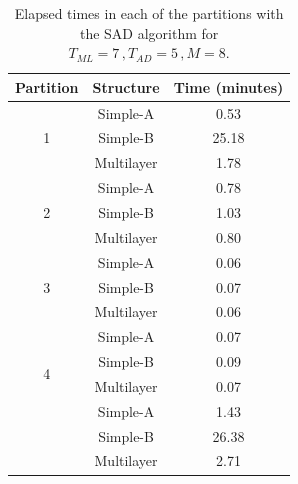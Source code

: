 \documentclass[12pt]{article}
\begin{document}
        \begin{table}[H]
        \centering
        \label{table1}
        \caption{Elapsed times in each of the partitions with the SAD algorithm for  $T_{ML} = 7 \,, T_{AD} = 5 \,, M = 8$.}
        \scriptsize
        \begin{tabular}{llr}
            \hline
            \multicolumn{1}{c}{Partition} & \multicolumn{1}{c}{Structure} & \multicolumn{1}{c}{Time (minutes)} \\
            \hline
            \multicolumn{1}{c}{\multirow{3}{*}{1}} & \multicolumn{1}{c}{Simple-A} & \multicolumn{1}{c}{0.53} \\
            \multicolumn{1}{c}{} & \multicolumn{1}{c}{Simple-B} & \multicolumn{1}{c}{25.18} \\
            \multicolumn{1}{c}{} & \multicolumn{1}{c}{Multilayer} & \multicolumn{1}{c}{1.78} \\
            \hline
            \multicolumn{1}{c}{\multirow{3}{*}{2}} & \multicolumn{1}{c}{Simple-A} & \multicolumn{1}{c}{0.78} \\
            \multicolumn{1}{c}{} & \multicolumn{1}{c}{Simple-B} & \multicolumn{1}{c}{1.03} \\
            \multicolumn{1}{c}{} & \multicolumn{1}{c}{Multilayer} & \multicolumn{1}{c}{0.80} \\
            \hline
            \multicolumn{1}{c}{\multirow{3}{*}{3}} & \multicolumn{1}{c}{Simple-A} & \multicolumn{1}{c}{0.06} \\
            \multicolumn{1}{c}{} & \multicolumn{1}{c}{Simple-B} & \multicolumn{1}{c}{0.07} \\
            \multicolumn{1}{c}{} & \multicolumn{1}{c}{Multilayer} & \multicolumn{1}{c}{0.06} \\
            \hline
            \multicolumn{1}{c}{\multirow{4}{*}{4}} & \multicolumn{1}{c}{Simple-A} & \multicolumn{1}{c}{0.07} \\
            \multicolumn{1}{c}{} & \multicolumn{1}{c}{Simple-B} & \multicolumn{1}{c}{0.09} \\
            \multicolumn{1}{c}{} & \multicolumn{1}{c}{Multilayer} & \multicolumn{1}{c}{0.07} \\
            \hline
            \multicolumn{1}{c}{\multirow{4}{*}{Total}} & \multicolumn{1}{c}{Simple-A} & \multicolumn{1}{c}{1.43} \\
            \multicolumn{1}{c}{} & \multicolumn{1}{c}{Simple-B} & \multicolumn{1}{c}{26.38} \\
            \multicolumn{1}{c}{} & \multicolumn{1}{c}{Multilayer} & \multicolumn{1}{c}{2.71} \\
            \hline
        \end{tabular}
    \end{table}
\end{document}
